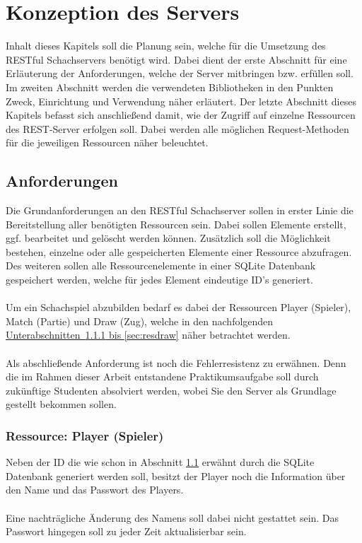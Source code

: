 
\chapter{Konzeption des Servers}
Inhalt dieses Kapitels soll die Planung sein, welche für die Umsetzung des RESTful Schachservers benötigt wird. Dabei dient der erste Abschnitt für eine Erläuterung der Anforderungen, welche der Server mitbringen bzw. erfüllen soll. Im zweiten Abschnitt werden die verwendeten Bibliotheken in den Punkten Zweck, Einrichtung und Verwendung näher erläutert. Der letzte Abschnitt dieses Kapitels befasst sich anschließend damit, wie der Zugriff auf einzelne Ressourcen des REST-Server erfolgen soll. Dabei werden alle möglichen Request-Methoden für die jeweiligen Ressourcen näher beleuchtet.

\section{Anforderungen}\label{sec:anforderungen}
Die Grundanforderungen an den RESTful Schachserver sollen in erster Linie die Bereitstellung aller benötigten Ressourcen sein. Dabei sollen Elemente erstellt, ggf. bearbeitet und gelöscht werden können. Zusätzlich soll die Möglichkeit bestehen, einzelne oder alle gespeicherten Elemente einer Ressource abzufragen. Des weiteren sollen alle Ressourcenelemente in einer SQLite Datenbank gespeichert werden, welche für jedes Element eindeutige ID's generiert.\\
\\
Um ein Schachspiel abzubilden bedarf es dabei der Ressourcen Player (Spieler), Match (Partie) und Draw (Zug), welche in den nachfolgenden \hyperref[sec:resplayer, sec:resdraw]{Unterabschnitten~\ref{sec:resplayer} bis \ref{sec:resdraw}} näher betrachtet werden.\\
\\
Als abschließende Anforderung ist noch die Fehlerresistenz zu erwähnen. Denn die im Rahmen dieser Arbeit entstandene Praktikumsaufgabe  soll durch zukünftige Studenten absolviert werden, wobei Sie den Server als Grundlage gestellt bekommen sollen.

\subsection{Ressource: Player (Spieler)}\label{sec:resplayer}
Neben der ID die wie schon in Abschnitt \ref{sec:anforderungen} erwähnt durch die SQLite Datenbank generiert werden soll, besitzt der Player noch die Information über den Name und das Passwort des Players.\\
\\
Eine nachträgliche Änderung des Namens soll dabei nicht gestattet sein. Das Passwort hingegen soll zu jeder Zeit aktualisierbar sein.

